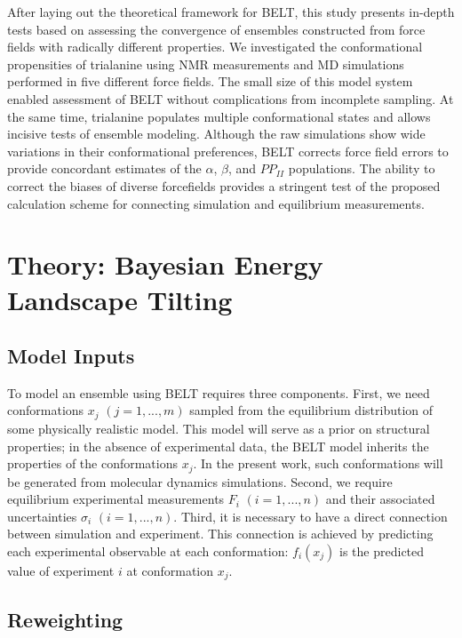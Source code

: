\documentclass[12pt]{article}
\begin{document}
After laying out the theoretical framework for BELT, this study presents in-depth tests based on assessing the convergence of ensembles constructed from force fields with radically different properties.  We investigated the conformational propensities of trialanine using NMR measurements \cite{Graf2007} and MD simulations performed in five different force fields.  The small size of this model system enabled assessment of BELT without complications from incomplete sampling.  At the same time, trialanine populates multiple conformational states and allows incisive tests of ensemble modeling.  Although the raw simulations show wide variations in their conformational preferences, BELT corrects force field errors to provide concordant estimates of the $\alpha$, $\beta$, and $PP_{II}$ populations.  The ability to correct the biases of diverse forcefields provides a stringent test of the proposed calculation scheme for connecting simulation and equilibrium measurements. 


\section*{Theory: Bayesian Energy Landscape Tilting}

\subsection*{Model Inputs}

To model an ensemble using BELT requires three components.  First, we need conformations $x_j$  $(j = 1 , ... , m)$ sampled from the equilibrium distribution of some physically realistic model.  This model will serve as a prior on structural properties; in the absence of experimental data, the BELT model inherits the properties of the conformations $x_j$.  In the present work, such conformations will be generated from molecular dynamics simulations.  Second, we require equilibrium experimental measurements $F_i$ $(i = 1 , ... , n)$ and their associated uncertainties $\sigma_i$ $(i = 1 , ... , n)$.  Third, it is necessary to have a direct connection between simulation and experiment.  This connection is achieved by predicting each experimental observable at each conformation: $f_i(x_j)$ is the predicted value of experiment $i$ at conformation $x_j$.  

\subsection*{Reweighting}
\end{document}
